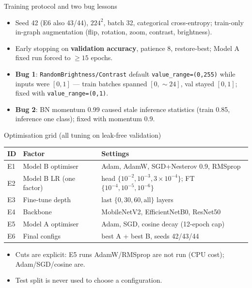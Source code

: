 \documentclass[aspectratio=169]{beamer}
\begin{document}
\begin{frame}{Training protocol and two bug lessons}
  \begin{itemize}
    \item Seed 42 (E6 also 43/44), $224^2$, batch 32, categorical
          cross-entropy; train-only in-graph augmentation (flip, rotation,
          zoom, contrast, brightness).
    \item Early stopping on \textbf{validation accuracy}, patience 8,
          restore-best; Model A fixed run forced to $\geq15$ epochs.
    \item \textbf{Bug 1}: \texttt{RandomBrightness/Contrast} default
          \texttt{value\_range=(0,255)} while inputs were $[0,1]$ --- train
          batches spanned $[0,\sim24]$, val stayed $[0,1]$; fixed with
          \texttt{value\_range=(0,1)}.
    \item \textbf{Bug 2}: BN momentum 0.99 caused stale inference statistics
          (train 0.85, inference one class); fixed with momentum 0.9.
  \end{itemize}
\end{frame}
\begin{frame}{Optimisation grid (all tuning on leak-free validation)}
  \scriptsize
  \begin{tabular}{lll}
    \toprule
    ID & Factor & Settings \\
    \midrule
    E1 & Model B optimiser & Adam, AdamW, SGD+Nesterov 0.9, RMSprop \\
    E2 & Model B LR (one factor) & head $\{10^{-2},10^{-3},3\times10^{-4}\}$;
                                   FT $\{10^{-4},10^{-5},10^{-6}\}$ \\
    E3 & Fine-tune depth & last $\{0,30,60,\text{all}\}$ layers \\
    E4 & Backbone & MobileNetV2, EfficientNetB0, ResNet50 \\
    E5 & Model A optimiser & Adam, SGD, cosine decay (12-epoch cap) \\
    E6 & Final configs & best A + best B, seeds 42/43/44 \\
    \bottomrule
  \end{tabular}
  \vspace{2mm}
  \begin{itemize}
    \item Cuts are explicit: E5 runs AdamW/RMSprop are not run (CPU cost);
          Adam/SGD/cosine are.
    \item Test split is never used to choose a configuration.
  \end{itemize}
\end{frame}
\end{document}
